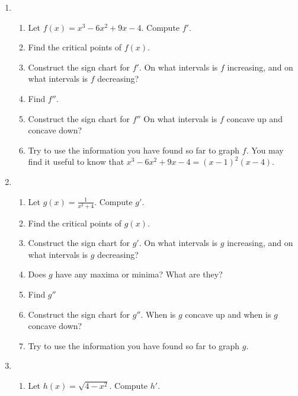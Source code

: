 \documentclass[10pt]{article}
\begin{document}



\newpage%


\begin{enumerate}

\item[Board 1.] \, 
\begin{enumerate}
    \item Let $f(x) = x^3 - 6x^2 + 9x - 4$. Compute $f'$. 
    \item Find the critical points of $f(x)$. 
    \item Construct the sign chart for $f'$. On what intervals is $f$ increasing, and on what intervals is $f$ decreasing? 
    \item Find $f''$. 
    \item Construct the sign chart for $f''$ On what intervals is $f$ concave up and concave down?
    \item Try to use the information you have found so far to graph $f$. You may find it useful to know that $x^3 - 6x^2 + 9x - 4 = (x-1)^2(x-4)$.
\end{enumerate}
\newpage
\item[Board 2.] \, 
\begin{enumerate}
    \item Let $g(x) = \frac{1}{x^2 + 4}$. Compute $g'$. 
    \item Find the critical points of $g(x)$. 
    \item Construct the sign chart for $g'$. On what intervals is $g$ increasing, and on what intervals is $g$ decreasing? 
    \item Does $g$ have any maxima or minima? What are they?
    \item Find  $g''$
    \item Construct the sign chart for $g''$.  When is $g$ concave up and when is $g$ concave down?
    \item Try to use the information you have found so far to graph $g$. 
\end{enumerate}
\newpage
\item[Board 3.] \,
\begin{enumerate}
    \item Let $h(x) = \sqrt{4 - x^2}$. Compute $h'$.

\end{enumerate}
\end{enumerate}
\end{document}
